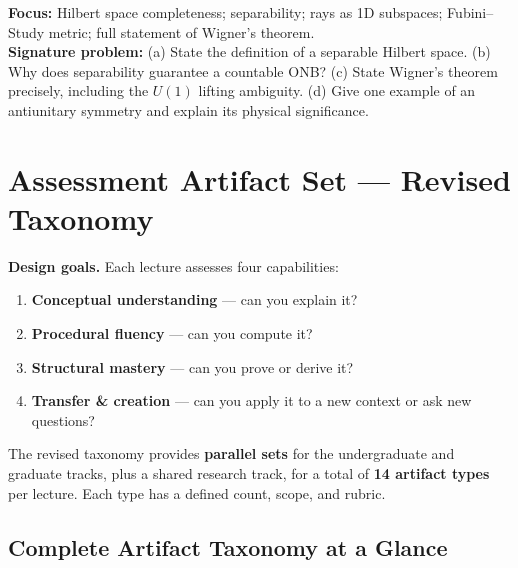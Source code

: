 \documentclass[11pt,a4paper]{article}
\begin{document}
\medskip
\begin{tcolorbox}[tierbox=tier5col, title={Tier 5 (PhD) --- L01}]
\textbf{Focus:} Hilbert space completeness; separability; rays as 1D subspaces;
Fubini--Study metric; full statement of Wigner's theorem.\\[4pt]
\textbf{Signature problem:} (a) State the definition of a separable Hilbert space.
(b) Why does separability guarantee a countable ONB?
(c) State Wigner's theorem precisely, including the $U(1)$ lifting ambiguity.
(d) Give one example of an antiunitary symmetry and explain its physical significance.
\end{tcolorbox}

\newpage
\section{Assessment Artifact Set --- Revised Taxonomy}
\label{sec:artifacts}

\begin{tcolorbox}[goldbox]
\textbf{Design goals.} Each lecture assesses four capabilities:
\begin{enumerate}[leftmargin=2em,itemsep=2pt]
  \item \textbf{Conceptual understanding} --- can you explain it?
  \item \textbf{Procedural fluency} --- can you compute it?
  \item \textbf{Structural mastery} --- can you prove or derive it?
  \item \textbf{Transfer \& creation} --- can you apply it to a new context or ask new questions?
\end{enumerate}

\medskip
The revised taxonomy provides \textbf{parallel sets} for the undergraduate and
graduate tracks, plus a shared research track, for a total of \textbf{14 artifact
types} per lecture. Each type has a defined count, scope, and rubric.
\end{tcolorbox}

\subsection{Complete Artifact Taxonomy at a Glance}
\end{document}
